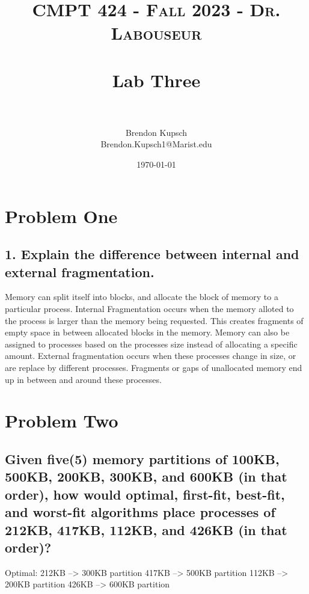 \documentclass[letterpaper, 10pt,DIV=13]{scrartcl}
\title{	
   \normalfont \normalsize 
   \textsc{CMPT 424 - Fall 2023 - Dr. Labouseur} \\[10pt] %
   \horrule{0.5pt} \\[0.25cm] 	%
   \huge Lab Three  \\     	    %
   \horrule{0.5pt} \\[0.25cm] 	%
}
\author{Brendon Kupsch \\ \normalsize Brendon.Kupsch1@Marist.edu}
\date{\normalsize\today} 	%
\numberwithin{equation}{section} %
\numberwithin{figure}{section} %
\numberwithin{table}{section} %
\begin{document}
\maketitle %


\section{Problem One}
\subsection{1. Explain the difference between internal and external fragmentation.}
Memory can split itself into blocks, and allocate the block of memory to a particular process. Internal Fragmentation occurs when the memory alloted to the process is larger than the memory being requested. This creates fragments of empty space in between allocated blocks in the memory. Memory can also be assigned to processes based on the processes size instead of allocating a specific amount. External fragmentation occurs when these processes change in size, or are replace by different processes. Fragments or gaps of unallocated memory end up in between and around these processes. 


\section{Problem Two}
\subsection{Given five(5) memory partitions of 100KB, 500KB, 200KB, 300KB, and 600KB (in that order), how would optimal, first-fit, best-fit, and worst-fit algorithms place processes of 212KB, 417KB, 112KB, and 426KB (in that order)?}
Optimal: 
\linebreak
	212KB --> 300KB partition
\linebreak
	417KB --> 500KB partition
\linebreak
	112KB --> 200KB partition
\linebreak
	426KB --> 600KB partition
\linebreak
\pagebreak
\end{document}
